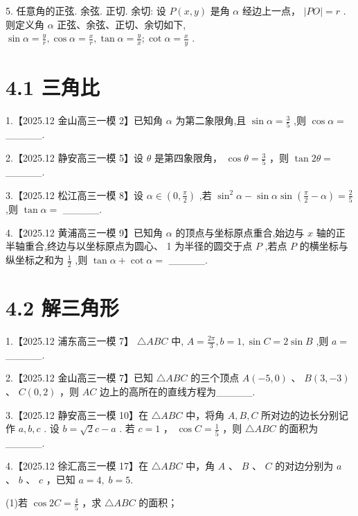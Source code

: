 \documentclass[10pt]{article}
\begin{document}
5. 任意角的正弦. 余弦. 正切. 余切: 设 \(P\left( {x,y}\right)\) 是角 \(\alpha\) 经边上一点， \(\left| {PO}\right|  = r\) . 则定义角 \(\alpha\) 正弦、余弦、正切、余切如下, \(\sin \alpha  = \frac{y}{r},\cos \alpha  = \frac{x}{r},\tan \alpha  = \frac{y}{x};\cot \alpha  = \frac{x}{y}\) .

\section*{4.1 三角比}

1.【2025.12 金山高三一模 2】已知角 \(\alpha\) 为第二象限角,且 \(\sin \alpha  = \frac{3}{5}\) ,则 \(\cos \alpha  =\) \_\_\_\_\_.

2.【2025.12 静安高三一模 5】设 \(\theta\) 是第四象限角， \(\cos \theta  = \frac{3}{5}\) ，则 \(\tan {2\theta } =\) \_\_\_\_\_.

3.【2025.12 松江高三一模 8】设 \(\alpha  \in  \left( {0,\frac{\pi }{2}}\right)\) ,若 \({\sin }^{2}\alpha  - \sin \alpha \sin \left( {\frac{\pi }{2} - \alpha }\right)  = \frac{2}{5}\) ,则 \(\tan \alpha  =\) \_\_\_\_\_.

4.【2025.12 黄浦高三一模 9】已知角 \(\alpha\) 的顶点与坐标原点重合,始边与 \(x\) 轴的正半轴重合,终边与以坐标原点为圆心、 1 为半径的圆交于点 \(P\) ,若点 \(P\) 的横坐标与纵坐标之和为 \(\frac{1}{2}\) ,则 \(\tan \alpha  + \cot \alpha  =\) \_\_\_\_\_.

\section*{4.2 解三角形}

1.【2025.12 浦东高三一模 7】 \(\bigtriangleup {ABC}\) 中, \(A = \frac{2\pi }{3},b = 1,\sin C = 2\sin B\) ,则 \(a =\) \_\_\_\_\_.

2.【2025.12 金山高三一模 7】已知 \(\bigtriangleup  {ABC}\) 的三个顶点 \(A\left( {-5,0}\right)\) 、 \(B\left( {3, - 3}\right)\) 、 \(C\left( {0,2}\right)\) ，则 \({AC}\) 边上的高所在的直线方程为\_\_\_\_\_.

3.【2025.12 静安高三一模 10】在 \(\bigtriangleup  {ABC}\) 中，将角 \(A,B,C\) 所对边的边长分别记作 \(a,b,c\) . 设 \(b = \sqrt{2}c - a\) . 若 \(c = 1\) ， \(\cos C = \frac{1}{5}\) ，则 \(\bigtriangleup {ABC}\) 的面积为\_\_\_\_\_.

4.【2025.12 徐汇高三一模 17】在 \(\bigtriangleup {ABC}\) 中，角 \(A\) 、 \(B\) 、 \(C\) 的对边分别为 \(a\) 、 \(b\) 、 \(c\) ，已知 \(a = 4,\;b = 5.\)

(1)若 \(\cos {2C} = \frac{4}{5}\) ，求 \(\bigtriangleup  {ABC}\) 的面积；
\end{document}
